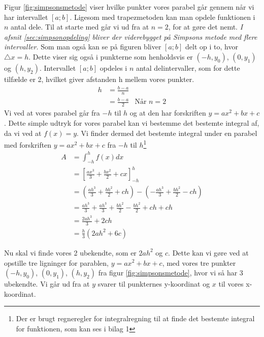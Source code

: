\documentclass[12pt]{article}
\numberwithin{equation}{section}
\begin{document}
Figur \ref{fig:simpsonsmetode} viser hvilke punkter vores parabel går gennem når vi har intervallet $[a;b]$. Ligesom med trapezmetoden kan man opdele funktionen i $n$ antal dele. Til at starte med går vi ud fra at $n=2$, for at gøre det nemt. \emph{I afsnit \ref{sec:simpsonopdeling} bliver der viderebygget på Simpsons metode med flere intervaller.}
Som man også kan se på figuren bliver $[a;b]$ delt op i to, hvor $\triangle x=h$. Dette viser sig også i punkterne som henholdsvis er $(-h,y_0)$, $(0,y_1)$ og $(h,y_2)$. Intervallet $[a;b]$ opdeles i $n$ antal delintervaller, som for dette tilfælde er 2, hvilket giver afstanden h mellem vores punkter.
\begin{align}
h &= \frac{b-a}{n} \nonumber
\\&= \frac{b-a}{2} &\text{Når } n=2
\end{align}
Vi ved at vores parabel går fra $-h$ til $h$ og at den har forskriften $y=ax^2+bx+c$. Dette simple udtryk for vores parabel kan vi bestemme det bestemte integral af, da vi ved at $f(x)=y$. Vi finder dermed det bestemte integral under en parabel med forskriften $y=ax^2+bx+c$ fra $-h$ til $h$\footnote{Der er brugt regneregler for integralregning til at finde det bestemte integral for funktionen, som kan ses i bilag 1}
\begin{align}
\label{eq:integral-hh}
A &=\int_{-h}^{h}f(x)dx \nonumber
\\ &=\left[ \frac{ax^3}{3} + \frac{bx^2}{2} + cx \right]_{-h}^{h} \nonumber
\\ &= \left( \frac{ah^3}{3} + \frac{bh^2}{2} + ch \right) - \left( -\frac{ah^3}{3} + \frac{bh^2}{2} - ch \right) \nonumber
\\ &= \frac{ah^3}{3} + \frac{ah^3}{3} + \frac{bh^2}{2} - \frac{bh^2}{2} + ch + ch \nonumber
\\ &= \frac{2ah^3}{3} + 2ch \nonumber
\\ &= \frac{h}{3}(2ah^2+6c)
\end{align}

Nu skal vi finde vores 2 ubekendte, som er $2ah^2$ og $c$. Dette kan vi gøre ved at opstille tre ligninger for parablen, $y=ax^2+bx+c$, med vores tre punkter $(-h,y_0)$, $(0,y_1)$, $(h,y_2)$ fra figur \ref{fig:simpsonsmetode}, hvor vi så har 3 ubekendte. Vi går ud fra at $y$ svarer til punkternes y-koordinat og $x$ til vores x-koordinat.
\end{document}
